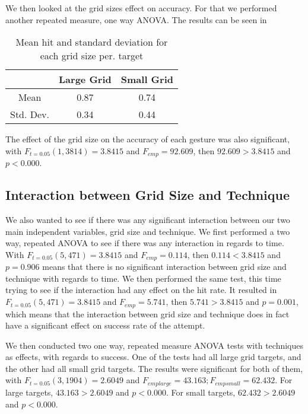 We then looked at the grid sizes effect on accuracy. For that we performed another repeated measure, one way ANOVA. The results can be seen in 

\begin{table}[H]
	\centering
	\begin{tabular}{|c|c|c|}
		\hline
		\rowcolor[HTML]{9B9B9B} 
		& \textbf{Large Grid} & \textbf{Small Grid} \\ \hline
		Mean & 0.87 & 0.74 \\ \hline
		Std. Dev. & 0.34 & 0.44 \\ \hline
		\end{tabular}
		\caption{Mean hit and standard deviation for each grid size per. target}
		\label{tab:meanHitSize}
\end{table}

The effect of the grid size on the accuracy of each gesture was also significant, with $F_{t=0.05}(1,3814)=3.8415$ and $F_{emp} = 92.609$, then $92.609 >3.8415$ and $p<0.000$.

\subsection{Interaction between Grid Size and Technique}
We also wanted to see if there was any significant interaction between our two main independent variables, grid size and technique. 
We first performed a two way, repeated ANOVA to see if there was any interaction in regards to time. With $F_{t=0.05}(5,471)=3.8415$ and $F_{emp}= 0.114$, then $0.114 < 3.8415$ and $p=0.906$ means that there is no significant interaction between grid size and technique with regards to time. We then performed the same test, this time trying to see if the interaction had any effect on the hit rate. It resulted in $F_{t=0.05}(5,471)=3.8415$ and $F_{emp}=5.741$, then $5.741 > 3.8415$ and $p=0.001$, which means that the interaction between grid size and technique does in fact have a significant effect on success rate of the attempt. 

We then conducted two one way, repeated measure ANOVA tests with techniques as effects, with regards to success. One of the tests had all large grid targets, and the other had all small grid targets. The results were significant for both of them, with $F_{t=0.05}(3,1904) = 2.6049$ and $F_{emplarge}= 43.163; F_{empsmall}=62.432$. For large targets, $43.163 > 2.6049$ and $p<0.000$. For small targets, $62.432 > 2.6049$ and $p < 0.000$.